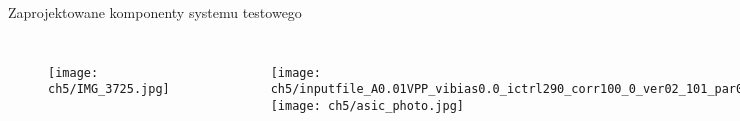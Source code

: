 \begin{frame}{Zaprojektowane komponenty systemu testowego}



\begin{columns}
    \vspace{-1em}

    \begin{figure}[H]
    \centering
        \texttt{[image: ch5/IMG\_3725.jpg]}
    \end{figure}

\vspace{-1.5em}
    \begin{figure}[H]
    \centering
        \texttt{[image: ch5/inputfile\_A0.01VPP\_vibias0.0\_ictrl290\_corr100\_0\_ver02\_101\_par0\_test\_generator.png]} 
        \texttt{[image: ch5/asic\_photo.jpg]}

    \end{figure}
\end{columns}


\end{frame}


